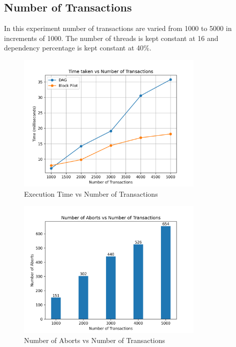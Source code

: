 \documentclass[12pt]{article}
\begin{document}
\subsection{Number of Transactions}
In this experiment number of transactions are varied from 1000 to 5000 in increments of 1000. 
The number of threads is kept constant at 16 and dependency percentage is kept constant at 40\%.
\begin{figure}[h]
    \centering
    \includegraphics[width=0.8\textwidth]{images/numTrans_vs_Time.png}
    \caption{Execution Time vs Number of Transactions}
    \label{fig:numTrans_vs_Time}
\end{figure}

\begin{figure}[h]
    \centering
    \includegraphics[width=0.8\textwidth]{images/numTrans_vs_Aborts.png}
    \caption{Number of Aborts vs Number of Transactions}
    \label{fig:numTrans_vs_Aborts}
\end{figure}
    
\end{document}
